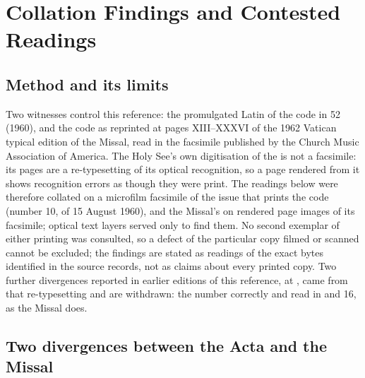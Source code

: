 \section{Collation Findings and Contested Readings}
\label{sec:collation}

\subsection{Method and its limits}

Two witnesses control this reference: the promulgated Latin of the code in  52 (1960), and the code as reprinted at pages XIII--XXXVI of the 1962 Vatican
typical edition of the Missal, read in the facsimile published by the Church Music Association
of America. The Holy See's own digitisation of the  is not a facsimile: its pages are
a re-typesetting of its optical recognition, so a page rendered from it shows recognition errors
as though they were print. The  readings below were therefore collated on a microfilm
facsimile of the issue that prints the code (number 10, of 15 August 1960), and the Missal's on
rendered page images of its facsimile; optical text layers served only to find them. No second
exemplar of either printing was consulted, so a defect of the particular copy filmed or scanned
cannot be excluded; the findings are stated as readings of the exact bytes identified in the
source records, not as claims about every printed copy. Two further divergences reported in
earlier editions of this reference, at , came from that re-typesetting and are
withdrawn: the  number  correctly and read  in 
and 16, as the Missal does.

\subsection{Two divergences between the Acta and the Missal}

